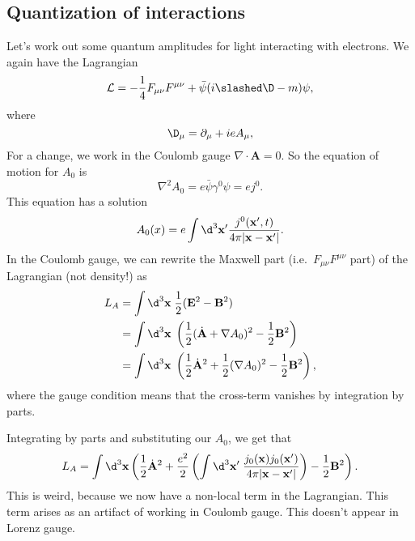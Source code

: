 \documentclass[a4paper]{article}
\begin{document}
\subsection{Quantization of interactions}
Let's work out some quantum amplitudes for light interacting with electrons. We again have the Lagrangian
\[
  \mathcal{L} = -\frac{1}{4} F_{\mu\nu}F^{\mu\nu} + \bar\psi (i \slashed \D - m)\psi,
\]
where
\[
  \D_\mu = \partial_\mu + i e A_\mu,
\]
For a change, we work in the Coulomb gauge $\nabla \cdot \mathbf{A} = 0$. So the equation of motion for $A_0$ is
\[
  \nabla^2 A_0 = e \bar\psi \gamma^0 \psi = ej^0.
\]
This equation has a solution
\[
  A_0(x) = e \int \d^3 \mathbf{x}' \frac{j^0(\mathbf{x}', t)}{4\pi |\mathbf{x} - \mathbf{x}'|}.
\]
In the Coulomb gauge, we can rewrite the Maxwell part (i.e.\ $F_{\mu\nu}F^{\mu\nu}$ part) of the Lagrangian (not density!) as
\begin{align*}
  L_A &= \int \d^3 \mathbf{x}\; \frac{1}{2}(\mathbf{E}^2 - \mathbf{B}^2)\\
  &= \int \d^3 \mathbf{x}\; \left(\frac{1}{2} (\dot{\mathbf{A}} + \nabla A_0)^2 - \frac{1}{2} \mathbf{B}^2\right)\\
  &= \int \d^3 \mathbf{x}\; \left(\frac{1}{2}\dot{\mathbf{A}}^2 + \frac{1}{2}(\nabla A_0)^2 - \frac{1}{2}\mathbf{B}^2\right),
\end{align*}
where the gauge condition means that the cross-term vanishes by integration by parts.

Integrating by parts and substituting our $A_0$, we get that
\[
  L_A = \int \d^3 \mathbf{x} \left(\frac{1}{2} \dot{\mathbf{A}}^2 + \frac{e^2}{2} \left(\int \d^3 \mathbf{x}'\; \frac{j_0(\mathbf{x}) j_0(\mathbf{x}')}{4\pi|\mathbf{x} - \mathbf{x}'|}\right) - \frac{1}{2}\mathbf{B}^2\right).
\]
This is weird, because we now have a non-local term in the Lagrangian. This term arises as an artifact of working in Coulomb gauge. This doesn't appear in Lorenz gauge.
\end{document}
